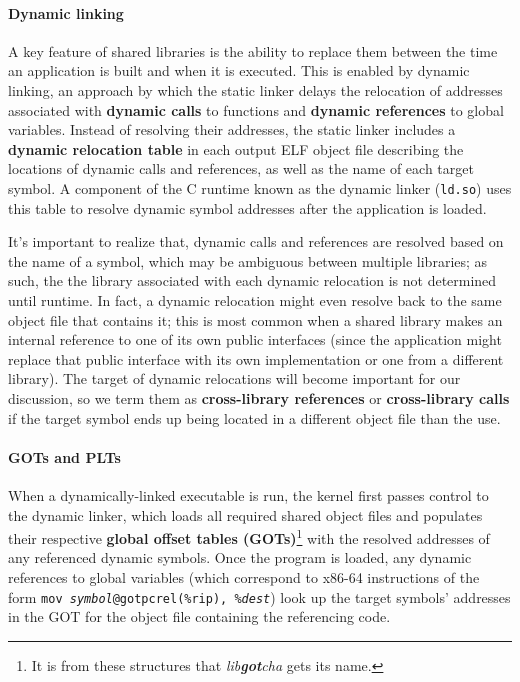 \paragraph{Dynamic linking}

A key feature of shared libraries is the ability to replace them between the time an
application is built and when it is executed.  This is enabled by dynamic linking, an
approach by which the static linker delays the relocation of addresses associated
with \textbf{dynamic calls} to functions and \textbf{dynamic references} to global
variables.  Instead of resolving their addresses, the static linker includes a
\textbf{dynamic relocation table} in each output ELF object file describing the
locations of dynamic calls and references, as well as the name of each target symbol.
A component of the C runtime known as the dynamic linker (\texttt{ld.so}) uses this
table to resolve dynamic symbol addresses after the application is loaded.

It's important to realize that, dynamic calls and references are resolved based on
the name of a symbol, which may be ambiguous between multiple libraries; as such, the
the library associated with each dynamic relocation is not determined until runtime.
In fact, a dynamic relocation might even resolve back to the same object file that
contains it; this is most common when a shared library makes an internal reference to
one of its own public interfaces (since the application might replace that public
interface with its own implementation or one from a different library).  The target
of dynamic relocations will become important for our discussion, so we term them as
\textbf{cross-library references} or \textbf{cross-library calls} if the target
symbol ends up being located in a different object file than the use.

\paragraph{GOTs and PLTs}


When a dynamically-linked executable is run, the kernel first passes control to the
dynamic linker, which loads all required shared object files and populates their
respective \textbf{global offset tables (GOTs)}\footnote{It is from these structures
that \textit{lib\textbf{got}cha} gets its name.} with the resolved addresses of any
referenced dynamic symbols.  Once the program is loaded, any dynamic references to
global variables (which correspond to x86-64 instructions of the form
\texttt{mov~\textit{symbol}@gotpcrel(\%rip),~\%\textit{dest}}) look up the target
symbols' addresses in the GOT for the object file containing the referencing code.

